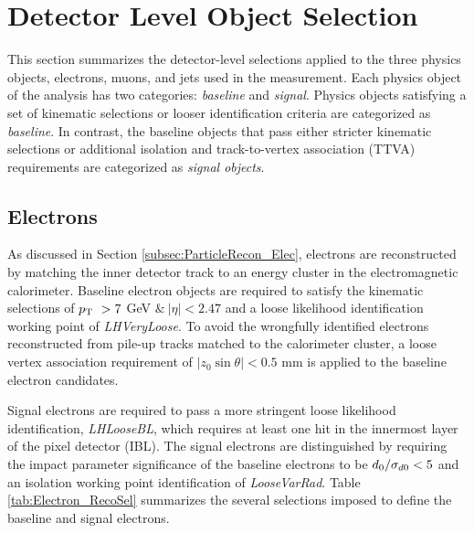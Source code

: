 \section{Detector Level Object Selection}
\label{sec:ObjReconstruction}

This section summarizes the detector-level selections applied to the three physics objects, electrons, muons, and jets used in the measurement. Each physics object of the analysis has two categories: \textit{baseline} and \textit{signal}. Physics objects satisfying a set of kinematic selections or looser identification criteria are categorized as \textit{baseline}. In contrast, the baseline objects that pass either stricter kinematic selections or additional isolation and track-to-vertex association (TTVA) requirements are categorized as \textit{signal objects}.

\subsection{Electrons}
\label{subsec:ElecRecon}

As discussed in Section \ref{subsec:ParticleRecon_Elec}, electrons are reconstructed by matching the inner detector track to an energy cluster in the electromagnetic calorimeter. Baseline electron objects are required to satisfy the kinematic selections of $p_{\textrm{T} ~} > 7$ GeV $ \&~ |\eta| < 2.47$ and a loose likelihood identification working point of \textit{LHVeryLoose}. To avoid the wrongfully identified electrons reconstructed from pile-up tracks matched to the calorimeter cluster, a loose vertex association requirement of $|z_{0}\sin\theta| < 0.5 $ mm is applied to the baseline electron candidates.

Signal electrons are required to pass a more stringent loose likelihood identification, \textit{LHLooseBL}, which requires at least one hit in the innermost layer of the pixel detector (IBL). The signal electrons are distinguished by requiring the impact parameter significance of the baseline electrons to be $d_{0}/ \sigma_{d0} < 5$ and an isolation working point identification of \textit{LooseVarRad}. Table \ref{tab:Electron_RecoSel} summarizes the several selections imposed to define the baseline and signal electrons.

